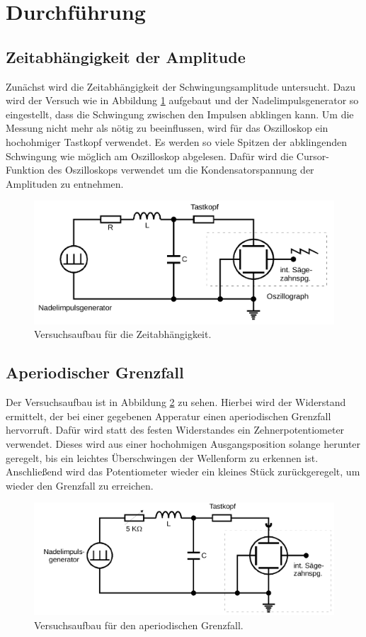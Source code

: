 \section{Durchführung}
\label{sec:Durchführung}
\subsection{Zeitabhängigkeit der Amplitude}
Zunächst wird die Zeitabhängigkeit der Schwingungsamplitude untersucht.
Dazu wird der Versuch wie in Abbildung \ref{fig:aufbau1} aufgebaut und der Nadelimpulsgenerator so eingestellt,
dass die Schwingung zwischen den Impulsen abklingen kann.
Um die Messung nicht mehr als nötig zu beeinflussen, wird für das Oszilloskop ein hochohmiger Tastkopf verwendet.
Es werden so viele Spitzen der abklingenden Schwingung wie möglich am Oszilloskop abgelesen.
Dafür wird die Cursor-Funktion des Oszilloskops verwendet um die Kondensatorspannung der Amplituden zu entnehmen.
\begin{figure}[H]
    \centering
    \caption{Versuchsaufbau für die Zeitabhängigkeit.\cite{v354}}
    \label{fig:aufbau1}
    \includegraphics[width=\textwidth]{content/aufbau1.png}
\end{figure}
\noindent
%
\subsection{Aperiodischer Grenzfall}
Der Versuchsaufbau ist in Abbildung \ref{fig:aufbau2} zu sehen.
Hierbei wird der Widerstand ermittelt, der bei einer gegebenen Apperatur einen aperiodischen Grenzfall hervorruft.
Dafür wird statt des festen Widerstandes ein Zehnerpotentiometer verwendet.
Dieses wird aus einer hochohmigen Ausgangsposition solange herunter geregelt, bis ein leichtes Überschwingen der Wellenform zu erkennen ist.
Anschließend wird das Potentiometer wieder ein kleines Stück zurückgeregelt, um wieder den Grenzfall zu erreichen.
\begin{figure}[H]
    \centering
    \caption{Versuchsaufbau für den aperiodischen Grenzfall.\cite{v354}}
    \label{fig:aufbau2}
    \includegraphics[width=\textwidth]{content/aufbau2.png}
\end{figure}
\noindent
%
